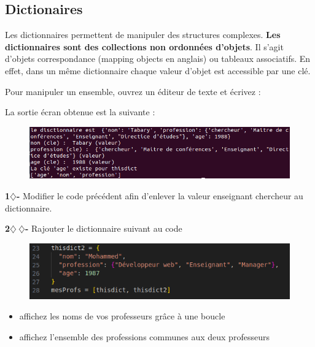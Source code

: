 \subsection{Dictionaires}


Les dictionnaires permettent de manipuler des structures complexes. \textbf{Les dictionnaires sont des collections non ordonnées d'objets}. Il s'agit d'objets correspondance (mapping objects en anglais) ou tableaux associatifs. En effet, dans un même dictionnaire chaque valeur d'objet est accessible par une clé.


Pour manipuler un ensemble, ouvrez un éditeur de texte et
écrivez :



La sortie écran obtenue est la suivante : 

\begin{figure}[H]
    \centering
    \includegraphics[scale = 0.7]{chapitre2/figures/dict.png}
\end{figure}


\begin{tcolorbox}[lefttitle=2cm, colframe=gray!75!black, title= \textbf{Exercice}]
\textbf{1$\diamondsuit$-}
Modifier le code précédent afin d'enlever la valeur enseignant chercheur au dictionnaire.

\textbf{2$\diamondsuit~\diamondsuit$-}
Rajouter le dictionnaire suivant au code

\begin{figure}[H]
    \centering
    \includegraphics[scale = 0.7]{chapitre2/figures/dict2.png}
\end{figure}

\begin{itemize}
    \item affichez les noms de vos professeurs grâce à une boucle
    \item affichez l'ensemble des professions communes aux deux professeurs
\end{itemize}




\end{tcolorbox}


